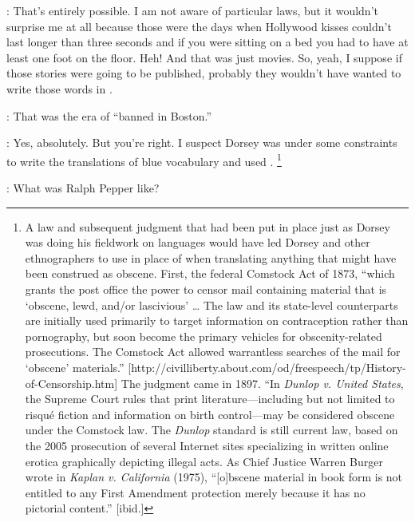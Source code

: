 \documentclass[output=paper]{LSP/langsci}
\begin{document}
: That's entirely possible. I am not aware of particular laws, but it wouldn't surprise me at all because those were the days when Hollywood kisses couldn't last longer than three seconds and if you were sitting on a bed you had to have at least one foot on the floor. Heh! And that was just movies. So, yeah, I suppose if those stories were going to be published, probably they wouldn't have wanted to write those words in .

: That was the era of ``banned in Boston.''

: Yes, absolutely. But you're right. I suspect Dorsey was under some constraints to write the translations of blue vocabulary and used . \footnote{A law and subsequent judgment that had been put in place just as Dorsey was doing his fieldwork on  languages would have led Dorsey and other ethnographers to use  in place of  when translating anything that might have been construed as obscene.  First, the federal Comstock Act of 1873, ``which grants the post office the power to censor mail containing material that is `obscene, lewd, and/or lascivious' {\ldots} The law and its state-level counterparts are initially used primarily to target information on contraception rather than pornography, but soon become the primary vehicles for obscenity-related prosecutions. The Comstock Act allowed warrantless searches of the mail for `obscene' materials.'' [{http://civilliberty.about.com/od/freespeech/tp/History-of-Censorship.htm}] The judgment came in 1897. ``In \textit{Dunlop v. United States}, the Supreme Court rules that print literature---including but not limited to risqu\'e fiction and information on birth control---may be considered obscene under the Comstock law. The \textit{Dunlop} standard is still current law, based on the 2005 prosecution of several Internet sites specializing in written online erotica graphically depicting illegal acts. As Chief Justice Warren Burger wrote in \textit{Kaplan v. California} (1975), ``[o]bscene material in book form is not entitled to any First Amendment protection merely because it has no pictorial content.''  [ibid.] }

: What was Ralph Pepper like?
\end{document}

